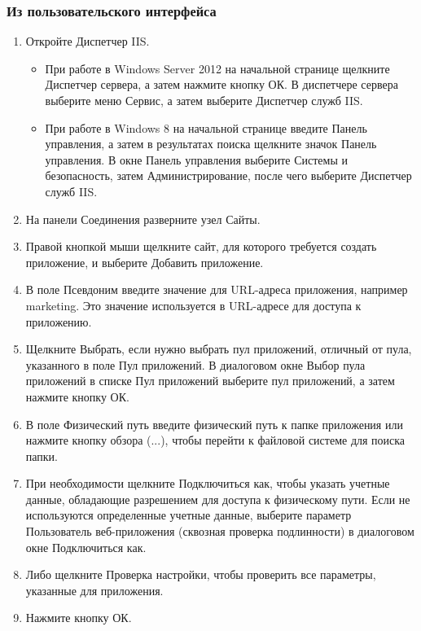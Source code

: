 \documentclass[12pt,a4paper,titlepage]{article}
\begin{document}
\subsubsection{Из пользовательского интерфейса}
\begin{enumerate}
\item Откройте Диспетчер IIS.
	\begin{itemize}
	\item При работе в Windows Server 2012 на начальной странице щелкните Диспетчер сервера, а затем нажмите кнопку ОК. В диспетчере сервера выберите меню Сервис, а затем выберите Диспетчер служб IIS.
	\item При работе в Windows 8 на начальной странице введите Панель управления, а затем в результатах поиска щелкните значок Панель управления. В окне Панель управления выберите Системы и безопасность, затем Администрирование, после чего выберите Диспетчер служб IIS.
	\end{itemize}
\item На панели Соединения разверните узел Сайты.
\item Правой кнопкой мыши щелкните сайт, для которого требуется создать приложение, и выберите Добавить приложение.
\item В поле Псевдоним введите значение для URL-адреса приложения, например marketing. Это значение используется в URL-адресе для доступа к приложению.
\item Щелкните Выбрать, если нужно выбрать пул приложений, отличный от пула, указанного в поле Пул приложений. В диалоговом окне Выбор пула приложений в списке Пул приложений выберите пул приложений, а затем нажмите кнопку ОК.
\item В поле Физический путь введите физический путь к папке приложения или нажмите кнопку обзора (...), чтобы перейти к файловой системе для поиска папки.
\item При необходимости щелкните Подключиться как, чтобы указать учетные данные, обладающие разрешением для доступа к физическому пути. Если не используются определенные учетные данные, выберите параметр Пользователь веб-приложения (сквозная проверка подлинности) в диалоговом окне Подключиться как.
\item Либо щелкните Проверка настройки, чтобы проверить все параметры, указанные для приложения.
\item Нажмите кнопку ОК.
\end{enumerate}
\end{document}
